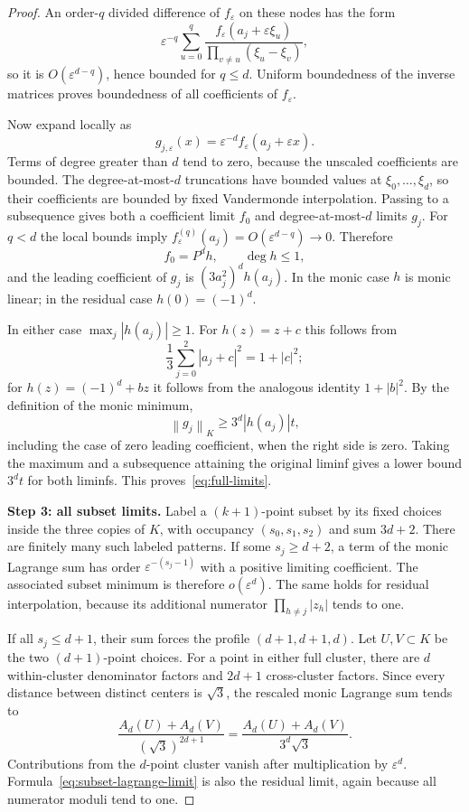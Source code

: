 \documentclass[11pt,a4paper]{article}
\theoremstyle{remark}
\newcommand{\norm}[1]{\left\lVert#1\right\rVert}
\newcommand{\eps}{\varepsilon}
\begin{document}
\begin{proof}
An order-$q$ divided difference of $f_\eps$ on these nodes has the form
\[
 \eps^{-q}\sum_{u=0}^q
 \frac{f_\eps(a_j+\eps\xi_u)}
 {\prod_{v\ne u}(\xi_u-\xi_v)},
\]
so it is $O(\eps^{d-q})$, hence bounded for $q\le d$.
Uniform boundedness of the inverse matrices proves boundedness of all
coefficients of $f_\eps$.

Now expand locally as
\[
 g_{j,\eps}(x)=\eps^{-d}f_\eps(a_j+\eps x).
\]
Terms of degree greater than $d$ tend to zero, because the unscaled
coefficients are bounded. The degree-at-most-$d$ truncations have bounded
values at $\xi_0,\ldots,\xi_d$, so their coefficients are bounded by fixed
Vandermonde interpolation. Passing to a subsequence gives both a coefficient
limit $f_0$ and degree-at-most-$d$ limits $g_j$.
For $q<d$ the local bounds imply
$f_\eps^{(q)}(a_j)=O(\eps^{d-q})\to0$. Therefore
\[
 f_0=P^dh,\qquad \deg h\le1,
\]
and the leading coefficient of $g_j$ is $(3a_j^2)^dh(a_j)$.
In the monic case $h$ is monic linear; in the residual case
$h(0)=(-1)^d$.

In either case $\max_j|h(a_j)|\ge1$. For $h(z)=z+c$ this follows from
\[
 \frac13\sum_{j=0}^2|a_j+c|^2=1+|c|^2;
\]
for $h(z)=(-1)^d+bz$ it follows from the analogous identity
$1+|b|^2$. By the definition of the monic minimum,
\[
 \norm{g_j}_K\ge3^d|h(a_j)|t,
\]
including the case of zero leading coefficient, when the right side is zero.
Taking the maximum and a subsequence attaining the original liminf gives a
lower bound $3^dt$ for both liminfs. This proves~\eqref{eq:full-limits}.

\medskip
\textbf{Step 3: all subset limits.}
Label a $(k+1)$-point subset by its fixed choices inside the three copies of
$K$, with occupancy $(s_0,s_1,s_2)$ and sum $3d+2$.
There are finitely many such labeled patterns.
If some $s_j\ge d+2$, a term of the monic Lagrange sum has order
$\eps^{-(s_j-1)}$ with a positive limiting coefficient.
The associated subset minimum is therefore $o(\eps^d)$.
The same holds for residual interpolation, because its additional numerator
$\prod_{h\ne j}|z_h|$ tends to one.

If all $s_j\le d+1$, their sum forces the profile $(d+1,d+1,d)$.
Let $U,V\subset K$ be the two $(d+1)$-point choices.
For a point in either full cluster, there are $d$ within-cluster denominator
factors and $2d+1$ cross-cluster factors. Since every distance between distinct
centers is $\sqrt3$, the rescaled monic Lagrange sum tends to
\begin{equation}\label{eq:subset-lagrange-limit}
 \frac{A_d(U)+A_d(V)}{(\sqrt3)^{2d+1}}
 =\frac{A_d(U)+A_d(V)}{3^d\sqrt3}.
\end{equation}
Contributions from the $d$-point cluster vanish after multiplication by
$\eps^d$. Formula~\eqref{eq:subset-lagrange-limit} is also the residual
limit, again because all numerator moduli tend to one.


\end{proof}
\end{document}

